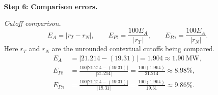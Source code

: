 \begin{enumerate}[leftmargin=*,label=\textbf{\arabic*.},itemsep=12pt,parsep=3pt,topsep=5pt]
\begin{minipage}{\linewidth}
\end{minipage}\par
\par\textbf{Step 6: Comparison errors.}\nopagebreak\enspace \par\noindent\begin{minipage}{\linewidth}
\par\textit{Cutoff comparison.}
\[
E_A=|r_T-r_N|,\qquad E_{Pt}=\frac{100E_A}{|r_T|},\qquad E_{Pn}=\frac{100E_A}{|r_N|}.
\]
Here $r_T$ and $r_N$ are the unrounded contextual cutoffs being compared.
\[
\begin{aligned}
E_A&=|21.214-(19.31)|=1.904\approx 1.90\ \text{MW},\\
E_{Pt}&=\frac{100|21.214-(19.31)|}{|21.214|}=\frac{100(1.904)}{21.214}\approx 8.98\%,\\
E_{Pn}&=\frac{100|21.214-(19.31)|}{|19.31|}=\frac{100(1.904)}{19.31}\approx 9.86\%.
\end{aligned}
\]
\end{minipage}\par


\end{enumerate}
